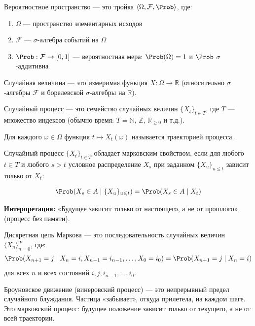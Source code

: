 \documentclass[11pt, a4paper]{extarticle}
\newcommand{\si}{\sigma}
\newcommand{\om}{\omega}
\newcommand{\Om}{\Omega}
\newcommand{\Fcal}{{\mathcal F}}
\newcommand{\Z}{{\mathbb Z}}
\newcommand{\R}{{\mathbb R}}
\newcommand{\N}{{\mathbb N}}
\renewcommand{\le}{\leqslant}
\renewcommand{\P}{\Prob}
\begin{document}
\begin{definition}
Вероятностное пространство --- это тройка $\langle \Om, \Fcal, \P \rangle$, где:
\begin{enumerate}
    \item $\Om$ --- пространство элементарных исходов
    \item $\Fcal$ --- $\si$-алгебра событий на $\Om$
    \item $\P: \Fcal \to [0, 1]$ --- вероятностная мера: $\P(\Om) = 1$ и $\P$ $\si$-аддитивна
\end{enumerate}
\end{definition}

\begin{definition}
Случайная величина --- это измеримая функция $X: \Om \to \R$ (относительно $\si$-алгебры $\Fcal$ и борелевской $\si$-алгебры на $\R$).
\end{definition}

\begin{definition}
Случайный процесс --- это семейство случайных величин $\{X_t\}_{t \in T}$, где $T$ --- множество индексов (обычно время: $T = \N$, $\Z$, $\R_{\geq 0}$ и т.д.).

Для каждого $\om \in \Om$ функция $t \mapsto X_t(\om)$ называется траекторией процесса.
\end{definition}

\begin{definition}
Случайный процесс $\{X_t\}_{t \in T}$ обладает марковским свойством, если для любого $t \in T$ и любого $s > t$ условное распределение $X_s$ при заданном $\{X_u\}_{u \le t}$ зависит только от $X_t$:

$$\P(X_s \in A \mid \{X_u\}_{u \le t}) = \P(X_s \in A \mid X_t)$$

\textbf{Интерпретация:} «Будущее зависит только от настоящего, а не от прошлого» (процесс без памяти).
\end{definition}

\begin{definition}
Дискретная цепь Маркова --- это последовательность случайных величин $\langle X_n \rangle_{n=0}^\infty$, где:
$$\P(X_{n+1} = j \mid X_n = i, X_{n-1} = i_{n-1}, \ldots, X_0 = i_0) = \P(X_{n+1} = j \mid X_n = i)$$
для всех $n$ и всех состояний $i, j, i_{n-1}, \ldots, i_0$.
\end{definition}

\begin{remark}
Броуновское движение (винеровский процесс) --- это непрерывный предел случайного блуждания. Частица «забывает», откуда прилетела, на каждом шаге. Это марковский процесс: будущее положение зависит только от текущего, а не от всей траектории.
\end{remark}
\end{document}
